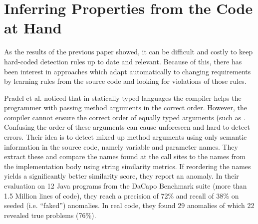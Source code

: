 \section{Inferring Properties from the Code at Hand}


As the results of the previous paper showed, it can be difficult and costly to keep hard-coded detection rules up to date and relevant.
Because of this, there has been interest in approaches which adapt automatically to changing requirements by learning rules from the source code and looking for violations of those rules.



Pradel et al. \cite{pradel2011detecting} noticed that in statically typed languages the compiler helps the programmer with passing method arguments in the correct order.
However, the compiler cannot ensure the correct order of equally typed arguments (such as .
Confusing the order of these arguments can cause unforeseen and hard to detect errors.
Their idea is to detect mixed up method arguments using only semantic information in the source code, namely variable and parameter names.
They extract these and compare the names found at the call sites to the names from the implementation body using string similarity metrics. 
If reordering the names yields a significantly better similarity score, they report an anomaly.
In their evaluation on 12 Java programs from the DaCapo Benchmark suite \cite{blackburn2006dacapo} (more than 1.5 Million lines of code), they reach a precision of 72\% and recall of 38\% on seeded (i.e. ``faked'') anomalies.
In real code, they found 29 anomalies of which 22 revealed true problems (76\%).

